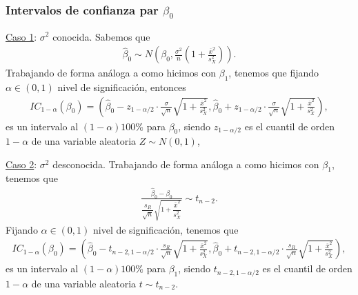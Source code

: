 \subsubsection{Intervalos de confianza par $\beta_0$}
\underline{Caso 1}: $\sigma^2$ conocida. Sabemos que
\begin{align*}
    \widehat{\beta}_0 \sim N\left( \beta_0, \frac{\sigma^2}{n}\left( 1 + \frac{\overline{x}^2}{s_X^2} \right) \right).
\end{align*}
Trabajando de forma análoga a como hicimos con $\beta_1$, tenemos que fijando $\alpha \in (0,1)$ nivel de significación, entonces
\begin{align*}
    IC_{1-\alpha}(\beta_0) = \left( \widehat{\beta}_0 - z_{1 - \alpha/2} \cdot \frac{\sigma}{\sqrt{n}}\sqrt{1 + \frac{\overline{x}^2}{s_X^2}}, \widehat{\beta}_0 + z_{1 - \alpha/2} \cdot \frac{\sigma}{\sqrt{n}}\sqrt{1 + \frac{\overline{x}^2}{s_X^2}}  \right),
\end{align*}
es un intervalo al $(1- \alpha) 100 \%$ para $\beta_0$, siendo $z_{1 - \alpha/2}$ es el cuantil de orden $1 - \alpha$ de una variable aleatoria $Z \sim N(0,1)$,

\underline{Caso 2}: $\sigma^2$ desconocida. Trabajando de forma análoga a como hicimos con $\beta_1$, tenemos que
\begin{align*}
    \frac{\widehat{\beta}_0 - \beta_0}{\dfrac{s_R}{\sqrt{n}} \sqrt{1 + \dfrac{\overline{x}^2}{s_X^2}}} \sim t_{n-2}.
\end{align*}
Fijando $\alpha \in (0,1)$ nivel de significación, tenemos que
\begin{align*}
    IC_{1-\alpha}(\beta_0) = \left( \widehat{\beta}_0 - t_{n-2,1 - \alpha/2} \cdot \frac{s_R}{\sqrt{n}}\sqrt{1 + \frac{\overline{x}^2}{s_X^2}}, \widehat{\beta}_0 + t_{n-2,1 - \alpha/2} \cdot \frac{s_R}{\sqrt{n}}\sqrt{1 + \frac{\overline{x}^2}{s_X^2}}  \right),
\end{align*}
es un intervalo al $(1- \alpha) 100 \%$ para $\beta_1$, siendo $t_{n-2,1 - \alpha/2}$ es el cuantil de orden $1 - \alpha$ de una variable aleatoria $t \sim t_{n-2}$.

